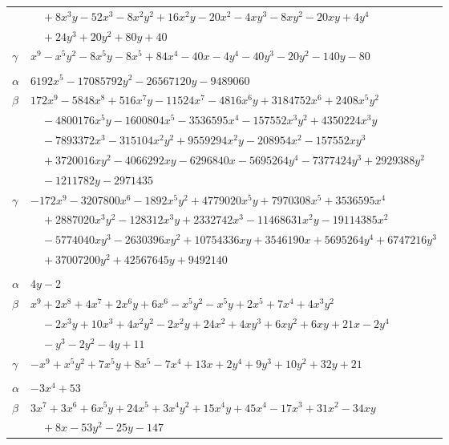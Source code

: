 \documentclass[11pt]{article}
\begin{document}
\begin{longtable}{@{}ll@{}}
 & $\quad +8x^{3}y-52x^{3}-8x^{2}y^{2}+16x^{2}y-20x^{2}-4xy^{3}-8xy^{2}-20xy+4y^{4}$\\
 & $\quad +24y^{3}+20y^{2}+80y+40$\\
$\gamma$ & $x^{9}-x^{5}y^{2}-8x^{5}y-8x^{5}+84x^{4}-40x-4y^{4}-40y^{3}-20y^{2}-140y-80$\\
\addlinespace[3pt]
\multicolumn{2}{@{}l}{$\{i,j\}=\{34,42\}$, $k_{ij}=2^{3}\cdot 5\cdot 7\cdot 11$}\\
$\alpha$ & $6192x^{5}-17085792y^{2}-26567120y-9489060$\\
$\beta$ & $172x^{9}-5848x^{8}+516x^{7}y-11524x^{7}-4816x^{6}y+3184752x^{6}+2408x^{5}y^{2}$\\
 & $\quad -4800176x^{5}y-1600804x^{5}-3536595x^{4}-157552x^{3}y^{2}+4350224x^{3}y$\\
 & $\quad -7893372x^{3}-315104x^{2}y^{2}+9559294x^{2}y-208954x^{2}-157552xy^{3}$\\
 & $\quad +3720016xy^{2}-4066292xy-6296840x-5695264y^{4}-7377424y^{3}+2929388y^{2}$\\
 & $\quad -1211782y-2971435$\\
$\gamma$ & $-172x^{9}-3207800x^{6}-1892x^{5}y^{2}+4779020x^{5}y+7970308x^{5}+3536595x^{4}$\\
 & $\quad +2887020x^{3}y^{2}-128312x^{3}y+2332742x^{3}-11468631x^{2}y-19114385x^{2}$\\
 & $\quad -5774040xy^{3}-2630396xy^{2}+10754336xy+3546190x+5695264y^{4}+6747216y^{3}$\\
 & $\quad +37007200y^{2}+42567645y+9492140$\\
\addlinespace[3pt]
\multicolumn{2}{@{}l}{$\{i,j\}=\{35,39\}$, $k_{ij}=2^{3}$}\\
$\alpha$ & $4y-2$\\
$\beta$ & $x^{9}+2x^{8}+4x^{7}+2x^{6}y+6x^{6}-x^{5}y^{2}-x^{5}y+2x^{5}+7x^{4}+4x^{3}y^{2}$\\
 & $\quad -2x^{3}y+10x^{3}+4x^{2}y^{2}-2x^{2}y+24x^{2}+4xy^{3}+6xy^{2}+6xy+21x-2y^{4}$\\
 & $\quad -y^{3}-2y^{2}-4y+11$\\
$\gamma$ & $-x^{9}+x^{5}y^{2}+7x^{5}y+8x^{5}-7x^{4}+13x+2y^{4}+9y^{3}+10y^{2}+32y+21$\\
\addlinespace[3pt]
\multicolumn{2}{@{}l}{$\{i,j\}=\{35,40\}$, $k_{ij}=2^{3}\cdot 5^{2}$}\\
$\alpha$ & $-3x^{4}+53$\\
$\beta$ & $3x^{7}+3x^{6}+6x^{5}y+24x^{5}+3x^{4}y^{2}+15x^{4}y+45x^{4}-17x^{3}+31x^{2}-34xy$\\
 & $\quad +8x-53y^{2}-25y-147$\\

\end{longtable}
\end{document}
